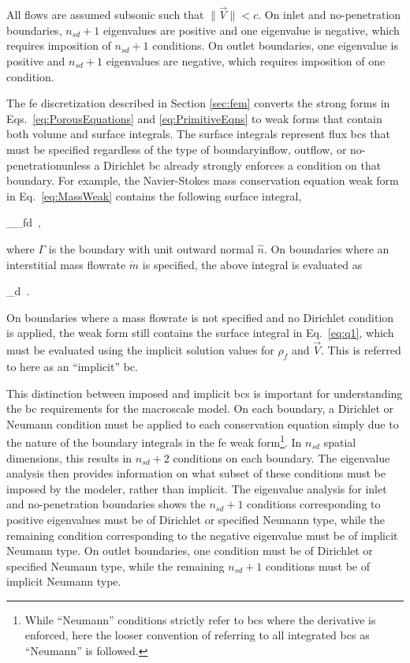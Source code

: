 All flows are assumed subsonic such that \(\|\vec{V}\|<c\). On inlet and no-penetration boundaries, \(n_{sd}+1\) eigenvalues are positive and one eigenvalue is negative, which requires imposition of \(n_{sd}+1\) conditions. On outlet boundaries, one eigenvalue is positive and \(n_{sd}+1\) eigenvalues are negative, which requires imposition of one condition.

The \gls{fe} discretization described in Section \ref{sec:fem} converts the strong forms in Eqs.\ \eqref{eq:PorousEquations} and \eqref{eq:PrimitiveEqns} to weak forms that contain both volume and surface integrals. The surface integrals represent flux \glspl{bc} that must be specified regardless of the type of boundary\mdash inflow, outflow, or no-penetration\mdash unless a Dirichlet \gls{bc} already strongly enforces a condition on that boundary. For example, the Navier-Stokes mass conservation equation weak form in Eq.\ \eqref{eq:MassWeak} contains the following surface integral,

\beq
\label{eq:q1}
\int_{\Gamma}\epsilon\rho_f\cdot{}d\Gamma\ ,
\eeq

\noindent where \(\Gamma\) is the boundary with unit outward normal \(\hat{n}\). On boundaries where an interstitial mass flowrate \(\dot{m}\) is specified, the above integral is evaluated as

\beq
\int_{\Gamma}\epsilon{}d\Gamma\ .
\eeq

\noindent On boundaries where a mass flowrate is not specified and no Dirichlet condition is applied, the weak form still contains the surface integral in Eq.\ \eqref{eq:q1}, which must be evaluated using the implicit solution values for \(\rho_f\) and \(\vec{V}\). This is referred to here as an ``implicit'' \gls{bc}. 

This distinction between imposed and implicit \glspl{bc} is important for understanding the \gls{bc} requirements for the macroscale model. On each boundary, a Dirichlet or Neumann condition must be applied to each conservation equation simply due to the nature of the boundary integrals in the \gls{fe} weak form\hspace{0.02cm}\footnote{While ``Neumann'' conditions strictly refer to \glspl{bc} where the derivative is enforced, here the looser convention of referring to all integrated \glspl{bc} as ``Neumann'' is followed.}. In \(n_{sd}\) spatial dimensions, this results in \(n_{sd}+2\) conditions on each boundary. The eigenvalue analysis then provides information on what subset of these conditions must be imposed by the modeler, rather than implicit. The eigenvalue analysis for inlet and no-penetration boundaries shows the \(n_{sd}+1\) conditions corresponding to positive eigenvalues must be of Dirichlet or specified Neumann type, while the remaining condition corresponding to the negative eigenvalue must be of implicit Neumann type. On outlet boundaries, one condition must be of Dirichlet or specified Neumann type, while the remaining \(n_{sd}+1\) conditions must be of implicit Neumann type. 

